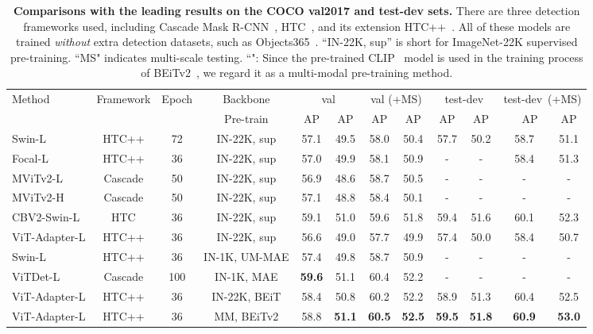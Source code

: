 \documentclass{article} \usepackage{iclr2023_conference,times}
\begin{document}
\begin{table}[t]\small
	\centering
	\renewcommand\arraystretch{1.0}
    \setlength\tabcolsep{0.85mm}
    \begin{tabular}{l|c|c|c|cc|cc|cc|cc}
        \toprule
        \multirow{2}{*}{Method} & \multirow{2}{*}{Framework} & \multirow{2}{*}{Epoch} & Backbone & \multicolumn{2}{c|}{val}  &\multicolumn{2}{c|}{val (+MS)}  &\multicolumn{2}{c|}{test-dev}  & \multicolumn{2}{c}{test-dev~(+MS)} \\
         & & & Pre-train & AP & AP & AP & AP& AP & AP& ~~~AP~ & AP \\
        \midrule
        Swin-L & HTC++ & 72 & IN-22K, sup & 57.1 & 49.5 & 58.0 & 50.4 & 57.7 & 50.2 & 58.7 & 51.1 \\
        Focal-L & HTC++ & 36 & IN-22K, sup & 57.0 & 49.9 & 58.1 & 50.9 & - & - & 58.4 & 51.3  \\
        MViTv2-L & Cascade & 50 & IN-22K, sup &56.9 & 48.6 & 58.7 & 50.5 & - & - & - & - \\
        MViTv2-H & Cascade & 50 & IN-22K, sup & 57.1 & 48.8 & 58.4 & 50.1 & - & - & - & - \\
CBV2-Swin-L & HTC  & 36& IN-22K, sup & 59.1 & 51.0 & 59.6 & 51.8 & 59.4 & 51.6 & 60.1 & 52.3  \\
	    \rowcolor{gray!20} 
        ViT-Adapter-L & HTC++ & 36 & IN-22K, sup & 56.6 & 49.0 & 57.7 & 49.9 & 57.4 & 50.0 & 58.4 & 50.7 \\
        \midrule
Swin-L & HTC++ & 36 & IN-1K, UM-MAE & 57.4 & 49.8 & 58.7 & 50.9 & - & - & - & - \\
        ViTDet-L & Cascade & 100 & IN-1K, MAE & \textbf{59.6} & 51.1 & 60.4 & 52.2 & -& -& -& -\\
\rowcolor{gray!20} 
        ViT-Adapter-L  & HTC++ & 36& IN-22K, BEiT & 58.4 & 50.8 & 60.2 & 52.2 & 58.9 & 51.3 & 60.4 & 52.5  \\
\rowcolor{yellow!15} 
        ViT-Adapter-L  & HTC++ & 36 & MM, BEiTv2 & 58.8& \textbf{51.1} & \textbf{60.5} & \textbf{52.5} & \textbf{59.5} & \textbf{51.8} & \textbf{60.9} & \textbf{53.0}  \\
	    \bottomrule
    \end{tabular}
    \caption{\textbf{Comparisons with the leading results on the COCO val2017 and test-dev sets.} 
    There are three detection frameworks used, including Cascade Mask R-CNN~\citep{cai2019cascade}, HTC~\citep{chen2019hybrid}, and its extension HTC++~\citep{liu2021swin}.
    All of these models are trained \emph{without} extra detection datasets, such as Objects365~\citep{shao2019objects365}.
    ``IN-22K, sup'' is short for ImageNet-22K supervised pre-training.
    ``MS" indicates multi-scale testing.
    ``": Since the pre-trained CLIP~\citep{radford2021learning} model is used in the training process of BEiTv2~\citep{peng2022beitv2}, we regard it as a multi-modal pre-training method.
    }
    \label{tab:sota_coco}
\end{table} 
\end{document}
